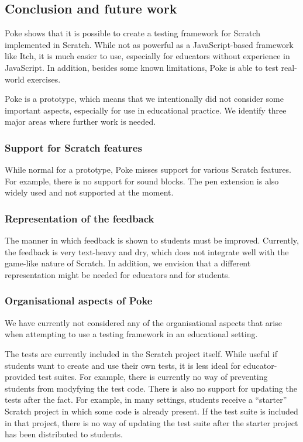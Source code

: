 \documentclass[../main]{subfiles}
\begin{document}
\subsection{Conclusion and future work}\label{subsec:conclusion-and-future-work}

Poke shows that it is possible to create a testing framework for Scratch implemented in Scratch.
While not as powerful as a JavaScript-based framework like Itch, it is much easier to use, especially for educators without experience in JavaScript.
In addition, besides some known limitations, Poke is able to test real-world exercises.

Poke is a prototype, which means that we intentionally did not consider some important aspects, especially for use in educational practice.
We identify three major areas where further work is needed.

\subsubsection{Support for Scratch features}
While normal for a prototype, Poke misses support for various Scratch features.
For example, there is no support for sound blocks.
The pen extension is also widely used and not supported at the moment.

\subsubsection{Representation of the feedback}
The manner in which feedback is shown to students must be improved.
Currently, the feedback is very text-heavy and dry, which does not integrate well with the game-like nature of Scratch.
In addition, we envision that a different representation might be needed for educators and for students.

\subsubsection{Organisational aspects of Poke}
We have currently not considered any of the organisational aspects that arise when attempting to use a testing framework in an educational setting.

The tests are currently included in the Scratch project itself.
While useful if students want to create and use their own tests, it is less ideal for educator-provided test suites.
For example, there is currently no way of preventing students from modyfying the test code.
There is also no support for updating the tests after the fact.
For example, in many settings, students receive a ``starter'' Scratch project in which some code is already present.
If the test suite is included in that project, there is no way of updating the test suite after the starter project has been distributed to students.
\end{document}
